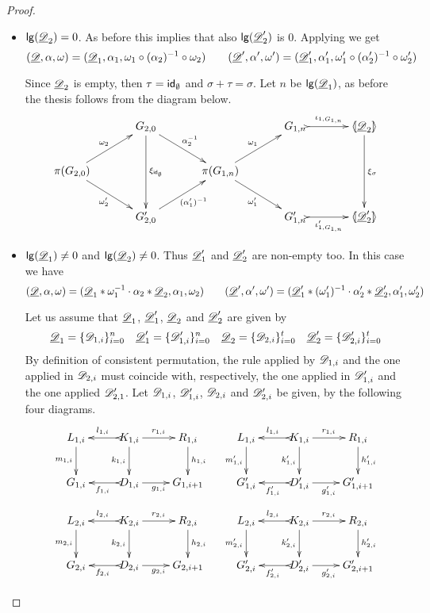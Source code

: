 \begin{proof}
\begin{itemize}
		\item $\mathsf{lg}(\underline{\mathscr{D}}_2)=0$.  As before this implies that also $\mathsf{lg}(\underline{\mathscr{D}}'_2)$ is $0$.  Applying  we get 
		\[
		(\underline{\mathscr{D}}, \alpha, \omega)=(\underline{\mathscr{D}}_1, \alpha_1, \omega_1 \circ (\alpha_2)^{-1}\circ \omega_2) \qquad (\underline{\mathscr{D}}', \alpha', \omega')=(\underline{\mathscr{D}}'_1, \alpha'_1, \omega'_1 \circ (\alpha'_2)^{-1}\circ \omega'_2)\]
		
		Since $\underline{\mathscr{D}}_2$ is empty, then $\tau=\mathsf{id}_{\emptyset}$ and $\sigma+\tau=\sigma$. Let $n$ be $\mathsf{lg}(\underline{\mathscr{D}}_1)$, as before the thesis follows from the diagram below.
		\[\xymatrix@C=35pt{& G_{2,0}\ar[dd]^{\xi_{\id{\emptyset}}} \ar[dr]^{\alpha^{-1}_2}&&G_{1,n}\ar@{>->}[r]^-{\iota_{1, G_{1,n}}} & \lpro \der{D}_2\rpro \ar[dd]^{\xi_{\sigma}}\\\pi(G_{2,0})  \ar[ur]^{\omega_2} \ar[dr]_{\omega'_2}&& \pi(G_{1,n}) \ar[ur]^{\omega_1} \ar[dr]_{\omega'_1}\\& G'_{2,0} \ar[ur]_{(\alpha'_1)^{-1}}&&G'_{1,n} \ar@{>->}[r]_-{\iota'_{1, G_{1,n}}}& \lpro \der{D}'_2\rpro}\]
		
		\item  $\mathsf{lg}(\underline{\mathscr{D}}_1)\neq0$ and $\mathsf{lg}(\underline{\mathscr{D}}_2)\neq 0$. Thus $\underline{\mathscr{D}}'_1$ and $\underline{\mathscr{D}}'_2$ are non-empty too. In this case we have
		\[	(\underline{\mathscr{D}}, \alpha, \omega)=(\underline{\mathscr{D}}_1*\omega_1^{-1}\cdot \alpha_2*\underline{\mathscr{D}}_2, \alpha_1, \omega_2)\qquad
		(\underline{\mathscr{D}}', \alpha', \omega')=(\underline{\mathscr{D}}'_1*(\omega'_1)^{-1}\cdot \alpha'_2*\underline{\mathscr{D}}'_2, \alpha'_1, \omega'_2)\]
		
		Let us assume that $\underline{\mathscr{D}}_1$, $\underline{\mathscr{D}}'_1$, $\underline{\mathscr{D}}_2$ and $\underline{\mathscr{D}}'_2$ are given by
		\[\underline{\mathscr{D}}_1=\{\mathscr{D}_{1,i}\}_{i=0}^n \quad \underline{\mathscr{D}}'_1=\{\mathscr{D}'_{1,i}\}_{i=0}^n \quad \underline{\mathscr{D}}_2=\{\mathscr{D}_{2,i}\}_{i=0}^t \quad \underline{\mathscr{D}}_2'=\{\mathscr{D}'_{2,i}\}_{i=0}^t\]
		By definition of consistent permutation, the rule applied by $\mathscr{D}_{1,i}$ and the one applied in $\mathscr{D}_{2,i}$  must coincide with, respectively, the one applied in $\mathscr{D}'_{1,i}$ and the one applied $\mathscr{D}'_{2,1}$. Let $\mathscr{D}_{1,i}$, $\mathscr{D}'_{1,i}$, $\mathscr{D}_{2,i}$ and $\mathscr{D}'_{2,i}$ be given, by the following four diagrams. 
		\[\xymatrix{L_{1,i} \ar[d]_{m_{1, i}}& K_{1,i} \ar[d]_{k_{1, i}} \ar[r]^{r_{1,i}} \ar@{>->}[l]_{l_{1,i}} & R_{1,i}\ar[d]^{h_{1, i}} &L_{1,i} \ar[d]_{m'_{1, i}}& K_{1,i} \ar[d]_{k'_{1, i}} \ar[r]^{r_{1,i}} \ar@{>->}[l]_{l_{1,i}} & R_{1,i}\ar[d]^{h'_{1, i}} \\G_{1,i} & D_{1,i} \ar[r]_{g_{1,i}} \ar@{>->}[l]^{f_{1,i}} & G_{1,i+1} & G'_{1,i} & D'_{1,i}\ar[r]_{g'_{1,i}} \ar@{>->}[l]^{f'_{1,i}}  & G'_{1,i+1}}\]		
		\[\xymatrix{L_{2,i} \ar[d]_{m_{2, i}}& K_{2,i} \ar[d]_{k_{2, i}} \ar[r]^{r_{2,i}} \ar@{>->}[l]_{l_{2,i}} & R_{2,i}\ar[d]^{h_{2, i}} &L_{2,i} \ar[d]_{m'_{2, i}}& K_{2,i} \ar[d]_{k'_{2, i}} \ar[r]^{r_{2,i}} \ar@{>->}[l]_{l_{2,i}} & R_{2,i}\ar[d]^{h'_{2, i}} \\G_{2,i} & D_{2,i} \ar[r]_{g_{2,i}} \ar@{>->}[l]^{f_{2,i}} & G_{2,i+1} & G'_{2,i} & D'_{2,i}\ar[r]_{g'_{2,i}} \ar@{>->}[l]^{f'_{2,i}}  & G'_{2,i+1}}\] 
		

\end{itemize}
\end{proof}
